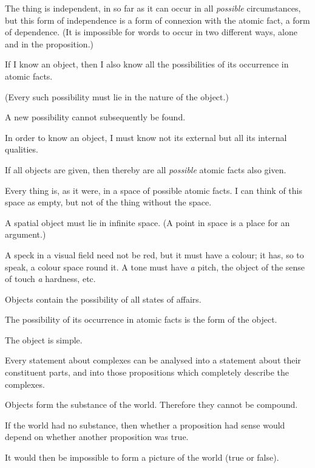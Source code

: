 {The thing is independent, in so far as it can
occur in all \emph{possible} circumstances, but this form
of independence is a form of connexion with the
atomic fact, a form of dependence. (It is impossible
for words to occur in two different ways,
alone and in the proposition.)}


{If I know an object, then I also know all the
possibilities of its occurrence in atomic facts.

(Every such possibility must lie in the nature
of the object.)

A new possibility cannot subsequently be
found.}


{In order to know an object, I must know not
its external but all its internal qualities.}


{If all objects are given, then thereby are all
\emph{possible} atomic facts also given.}


{Every thing is, as it were, in a space of possible
atomic facts. I can think of this space as empty,
but not of the thing without the space.}


{A spatial object must lie in infinite space.
(A point in space is a place for an argument.)

A speck in a visual field need not be red,
but it must have a colour; it has, so to speak,
a colour space round it. A tone must have \emph{a}
pitch, the object of the sense of touch \emph{a} hardness,
etc.}


{Objects contain the possibility of all states of
affairs.}


{The possibility of its occurrence in atomic facts
is the form of the object.}


{The object is simple.}


{Every statement about complexes can be analysed
into a statement about their constituent parts, and
into those propositions which completely describe
the complexes.}


{Objects form the substance of the world.
Therefore they cannot be compound.}


{If the world had no substance, then whether
a proposition had sense would depend on whether
another proposition was true.}


{It would then be impossible to form a picture
of the world (true or false).}


